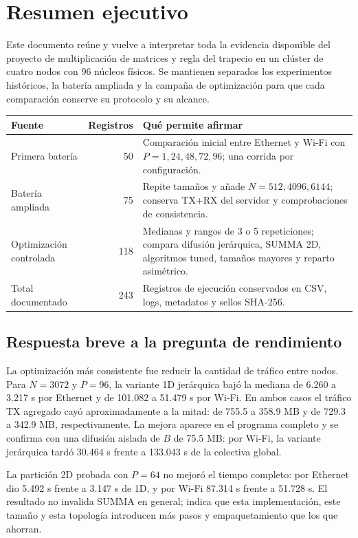\section{Resumen ejecutivo}

Este documento reúne y vuelve a interpretar toda la evidencia disponible del proyecto de multiplicación de matrices y regla del trapecio en un clúster de cuatro nodos con 96 núcleos físicos. Se mantienen separados los experimentos históricos, la batería ampliada y la campaña de optimización para que cada comparación conserve su protocolo y su alcance.

\begin{center}
\small
\begin{tabular}{p{3.5cm}r p{8.0cm}}
\toprule
Fuente & Registros & Qué permite afirmar \\
\midrule
Primera batería & 50 & Comparación inicial entre Ethernet y Wi-Fi con $P=1,24,48,72,96$; una corrida por configuración. \\
Batería ampliada & 75 & Repite tamaños y añade $N=512,4096,6144$; conserva TX+RX del servidor y comprobaciones de consistencia. \\
Optimización controlada & 118 & Medianas y rangos de 3 o 5 repeticiones; compara difusión jerárquica, SUMMA 2D, algoritmos tuned, tamaños mayores y reparto asimétrico. \\
\midrule
Total documentado & 243 & Registros de ejecución conservados en CSV, logs, metadatos y sellos SHA-256. \\
\bottomrule
\end{tabular}
\end{center}

\subsection{Respuesta breve a la pregunta de rendimiento}

La optimización más consistente fue reducir la cantidad de tráfico entre nodos. Para $N=3072$ y $P=96$, la variante 1D jerárquica bajó la mediana de 6.260 a 3.217 s por Ethernet y de 101.082 a 51.479 s por Wi-Fi. En ambos casos el tráfico TX agregado cayó aproximadamente a la mitad: de 755.5 a 358.9 MB y de 729.3 a 342.9 MB, respectivamente. La mejora aparece en el programa completo y se confirma con una difusión aislada de $B$ de 75.5 MB: por Wi-Fi, la variante jerárquica tardó 30.464 s frente a 133.043 s de la colectiva global.

La partición 2D probada con $P=64$ no mejoró el tiempo completo: por Ethernet dio 5.492 s frente a 3.147 s de 1D, y por Wi-Fi 87.314 s frente a 51.728 s. El resultado no invalida SUMMA en general; indica que esta implementación, este tamaño y esta topología introducen más pasos y empaquetamiento que los que ahorran.

